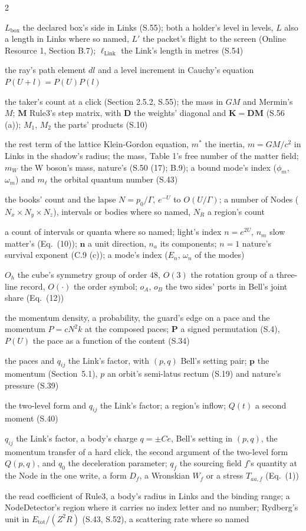 \documentclass[pdflatex,sn-mathphys-num]{sn-jnl}
\newcommand{\nom}[2]{\item[{#1}] #2}
\theoremstyle{thmstyleone}
\begin{document}
\begin{multicols}{2}
\begin{description}[style=unboxed,leftmargin=0pt,itemsep=0pt,parsep=0pt,font=\normalfont]
\nom{$L$ and $\ell$}{$L_{\mathrm{box}}$ the declared box's side in Links (S.55); both a holder's level in levels, $L$ also a length in Links where so named, $L'$ the packet's flight to the screen (Online Resource 1, Section B.7); $\ell_{\mathrm{Link}}$ the Link's length in metres (S.54)}
\nom{$l$}{the ray's path element $dl$ and a level increment in Cauchy's equation $P(U + l) = P(U)P(l)$}
\nom{$M$}{the taker's count at a click (Section 2.5.2, S.55); the mass in $GM$ and Mermin's $M$; $\mathbf M$ Rule3's step matrix, with $\mathbf D$ the weights' diagonal and $\mathbf K = \mathbf D\mathbf M$ (S.56 (a)); $M_1$, $M_2$ the parts' products (S.10)}
\nom{$m$}{the rest term of the lattice Klein-Gordon equation, $m^*$ the inertia, $m = GM / c^2$ in Links in the shadow's radius; the mass, Table 1's free number of the matter field; $m_W$ the W boson's mass, nature's (S.50 (17); B.9); a bound mode's index ($\phi_m$, $\omega_m$) and $m_\ell$ the orbital quantum number (S.43)}
\nom{$N$}{the books' count and the lapse $N = p_0 / \Gamma$, $e^{-U}$ to $O(U / \Gamma)$; a number of Nodes ($N_x \times N_y \times N_z$), intervals or bodies where so named, $N_R$ a region's count}
\nom{$n$}{a count of intervals or quanta where so named; light's index $n = e^{2U}$, $n_m$ slow matter's (Eq.~(10)); $\mathbf n$ a unit direction, $n_a$ its components; $n = 1$ nature's survival exponent (C.9 (c)); a mode's index ($E_n$, $\omega_n$ of the modes)}
\nom{$O$, $o_A$, $o_B$}{$O_h$ the cube's symmetry group of order $48$, $O(3)$ the rotation group of a three-line record, $O(\cdot)$ the order symbol; $o_A$, $o_B$ the two sides' ports in Bell's joint share (Eq.~(12))}
\nom{$P$}{the momentum density, a probability, the guard's edge on a pace and the momentum $P = cN^2 k$ at the composed paces; $\mathbf P$ a signed permutation (S.4), $P(U)$ the pace as a function of the content (S.34)}
\nom{$p_0$, $p_i$, $p_a$}{the paces and $q_{ij}$ the Link's factor, with $(p, q)$ Bell's setting pair; $\mathbf p$ the momentum (Section~5.1), $p$ an orbit's semi-latus rectum (S.19) and nature's pressure (S.39)}
\nom{$Q$, $Q_R$}{the two-level form and $q_{ij}$ the Link's factor; a region's inflow; $Q(t)$ a second moment (S.40)}
\nom{$q$}{$q_{ij}$ the Link's factor, a body's charge $q = \pm Ce$, Bell's setting in $(p, q)$, the momentum transfer of a hard click, the second argument of the two-level form $Q(p, q)$, and $q_0$ the deceleration parameter; $q_f$ the sourcing field $f$'s quantity at the Node in the one write, a form $D_f$, a Wronskian $W_f$ or a stress $T_{aa,f}$ (Eq.~(1))}
\nom{$R$}{the read coefficient of Rule3, a body's radius in Links and the binding range; a NodeDetector's region where it carries no index letter and no number; Rydberg's unit in $E_{\mathrm{tot}} / (Z^2 R)$ (S.43, S.52), a scattering rate where so named}

\end{description}
\end{multicols}
\end{document}
